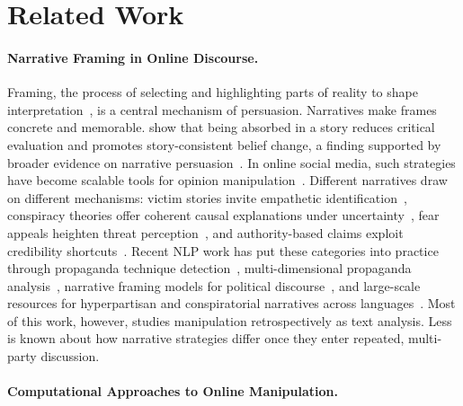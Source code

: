 \section{Related Work}
\label{sec:related}

\paragraph{Narrative Framing in Online Discourse.}

Framing, the process of selecting and highlighting parts of reality to shape interpretation~\citep{Entman1993}, is a central mechanism of persuasion. Narratives make frames concrete and memorable. \citet{Green2000} show that being absorbed in a story reduces critical evaluation and promotes story-consistent belief change, a finding supported by broader evidence on narrative persuasion~\citep{BraddockDillard2016}. In online social media, such strategies have become scalable tools for opinion manipulation~\citep{Tucker2018,Wardle2017}. Different narratives draw on different mechanisms: victim stories invite empathetic identification~\citep{Green2000}, conspiracy theories offer coherent causal explanations under uncertainty~\citep{Douglas2017}, fear appeals heighten threat perception~\citep{Witte1992}, and authority-based claims exploit credibility shortcuts~\citep{Cialdini2001}. Recent NLP work has put these categories into practice through propaganda technique detection~\citep{DaSanMartino2019}, multi-dimensional propaganda analysis~\citep{liu-etal-2025-propainsight}, narrative framing models for political discourse~\citep{otmakhova-frermann-2025-narrative}, and large-scale resources for hyperpartisan and conspiratorial narratives across languages~\citep{maggini-etal-2026-partisanlens}. Most of this work, however, studies manipulation retrospectively as text analysis. Less is known about how narrative strategies differ once they enter repeated, multi-party discussion.

\paragraph{Computational Approaches to Online Manipulation.}

